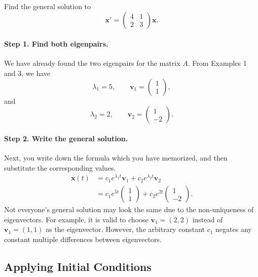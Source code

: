 \documentclass[10pt,letterpaper]{article}
\begin{document}
\begin{example}[4]{
Find the general solution to
\[
\mathbf{x}'=
\begin{pmatrix}
4&1\\
2&3
\end{pmatrix}\mathbf{x}.
\]
}

\paragraph{Step 1. Find both eigenpairs.}
We have already found the two eigenpairs for the matrix $A$. From Examples 1 and 3, we have
\[
\lambda_1=5,\qquad
\mathbf{v}_1=\begin{pmatrix}1\\1\end{pmatrix},
\]
and
\[
\lambda_2=2,\qquad
\mathbf{v}_2=\begin{pmatrix}1\\-2\end{pmatrix}.
\]

\paragraph{Step 2. Write the general solution.} Next, you write down the formula which you have memorized, and then substitute the corresponding values.
\begin{align*}    
\mathbf{x}(t)&=c_1e^{\lambda_1t}\mathbf{v}_1 +c_2e^{\lambda_2t}\mathbf{v}_2\\
&=
\boxed{
c_1e^{5t}\begin{pmatrix}1\\1\end{pmatrix}
+c_2e^{2t}\begin{pmatrix}1\\-2\end{pmatrix}.
}
\end{align*}
Not everyone's general solution may look the same due to the non-uniqueness of eigenvectors. For example, it is valid to choose $\textbf{v}_1=(2,2)$ instead of $\textbf{v}_1=(1,1)$ as the eigenvector. However, the arbitrary constant $c_1$ negates any constant multiple differences between eigenvectors.

\end{example}

\subsection{Applying Initial Conditions}
\end{document}
